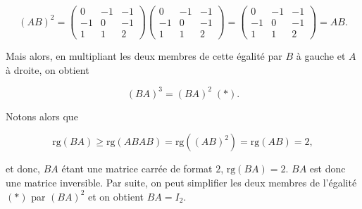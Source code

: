 {{$$(AB)^2=\left(
\begin{array}{ccc}
0&-1&-1\\
-1&0&-1\\
1&1&2
\end{array}
\right)\left(
\begin{array}{ccc}
0&-1&-1\\
-1&0&-1\\
1&1&2
\end{array}
\right)=\left(
\begin{array}{ccc}
0&-1&-1\\
-1&0&-1\\
1&1&2
\end{array}
\right)=AB.$$

Mais alors, en multipliant les deux membres de cette égalité par $B$ à gauche et $A$ à droite, on obtient

$$(BA)^3=(BA)^2\;(*).$$

Notons alors que 

$$\mbox{rg}(BA)\geq\mbox{rg}(ABAB)=\mbox{rg}((AB)^2)=\mbox{rg}(AB)=2,$$

et donc, $BA$ étant une matrice carrée de format $2$, $\mbox{rg}(BA)=2$. $BA$ est donc une matrice inversible. Par suite, on peut simplifier les deux membres de l'égalité $(*)$ par $(BA)^2$ et on obtient $BA=I_2$.
}
}
